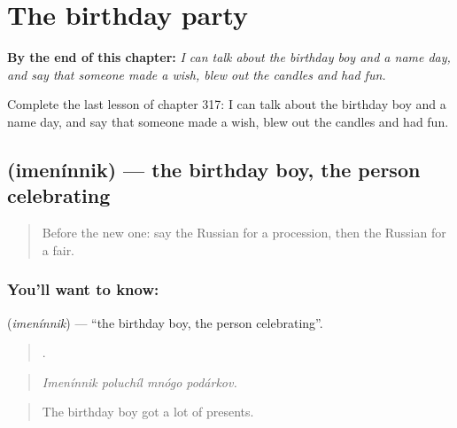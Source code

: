 
\chapter{The birthday party}
\label{ch:ru-the-birthday-party}

\begin{chapteropening}
\textbf{By the end of this chapter:} \emph{I can talk about the birthday boy and a name day, and say that someone made a wish, blew out the candles and had fun.}

Complete the last lesson of chapter 317: I can talk about the birthday boy and a name day, and say that someone made a wish, blew out the candles and had fun.
\end{chapteropening}

\section[\texorpdfstring{\ru{именинник} (imenínnik)}{именинник (imenínnik)}]{ (imenínnik) — the birthday boy, the person celebrating}

\label{lesson:RU-C317-imeninnik}



\begin{quote}
Before the new one: say the Russian for a procession, then the Russian for a fair.
\end{quote}

\subsection*{You'll want to know: }
\textbf{} (\emph{imenínnik}) — \textquotedblleft{}the birthday boy, the person celebrating\textquotedblright{}.

\begin{quote}
   .
\end{quote}

\begin{quote}
\emph{Imenínnik poluchíl mnógo podárkov.}
\end{quote}

\begin{quote}
The birthday boy got a lot of presents.
\end{quote}

